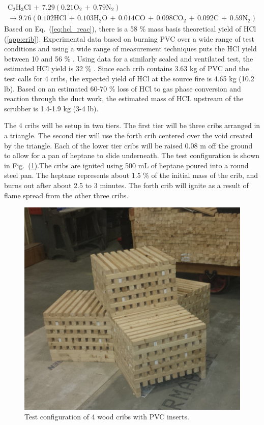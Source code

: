 \documentclass[12pt,oneside]{book}
\renewcommand{\C}{\mbox{C}}
\renewcommand{\H}{\mbox{H}}
\renewcommand{\O}{\mbox{O}}
\newcommand{\N}{\mbox{N}}
\newcommand{\Cl}{\mbox{Cl}}
\newcommand{\HCl}{\mbox{HCl}}
\begin{document}
\begin{multline}
\C_2\H_3\Cl \,+\, 7.29(0.21 \O_2 \,+\, 0.79 \N_2) \\
\rightarrow 9.76(0.102\HCl \,+\, 0.103\H_2\O \,+\, 0.014 \C\O \,+\, 0.098 \C\O_2 \,+\, 0.092 \C \,+\, 0.59 \N_2)
\label{eq:hcl_reac}
\end{multline}
Based on Eq.~(\ref{eq:hcl_reac}), there is a 58 \% mass basis theoretical yield of HCl (\ref{app:crib}).  Experimental data based on burning PVC over a wide range of test conditions and using a wide range of measurement techniques puts the HCl yield between 10 and 56 \% \cite{Leeds:PVC}. Using data for a similarly scaled and ventilated test, the estimated HCl yield is 32 \% \cite{Persson1998}. Since each crib contains 3.63 kg of PVC and the test calls for 4 cribs, the expected yield of HCl at the source fire is 4.65 kg (10.2 lb). Based on an estimated 60-70 \% loss of HCl to gas phase conversion and reaction through the duct work, the estimated mass of HCL upstream of the scrubber is 1.4-1.9 kg (3-4 lb).

The 4 cribs will be setup in two tiers. The first tier will be three cribs arranged in a triangle. The second tier will use the forth crib centered over the void created by the triangle. Each of the lower tier cribs will be raised 0.08 m off the ground to allow for a pan of heptane to slide underneath. The test configuration is shown in Fig.~(\ref{fig:test_crib}).The cribs are ignited using 500 mL of heptane poured into a round steel pan. The heptane represents about 1.5 \% of the initial mass of the crib, and burns out after about 2.5 to 3 minutes. The forth crib will ignite as a result of flame spread from the other three cribs.

\begin{figure}
\centering
\includegraphics[width=.7\textwidth]{../Figures/cribs}
\caption {Test configuration of 4 wood cribs with PVC inserts.}
\label{fig:test_crib}
\end{figure}
\end{document}
